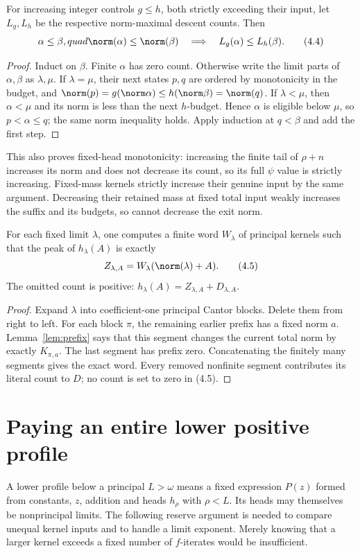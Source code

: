 \documentclass[11pt,a4paper]{article}
\newcommand{\KK}[2]{K_{#1,#2}}
\begin{document}
\begin{lemma}\label{lem:counts}
For increasing integer controls $g\le h$, both strictly exceeding their
input, let $L_g,L_h$ be the respective norm-maximal descent counts.
Then
\[
 \alpha\le\beta,quad\norm(\alpha)\le\norm(\beta)
       \quad\Longrightarrow\quad L_g(\alpha)\le L_h(\beta). \tag{4.4}
\]
\end{lemma}
\begin{proof}
Induct on $\beta$. Finite $\alpha$ has zero count. Otherwise write the
limit parts of $\alpha,\beta$ as $\lambda,\mu$. If $\lambda=\mu$, their
next states $p,q$ are ordered by monotonicity in the budget, and
$\norm(p)=g(\norm\alpha)\le h(\norm\beta)=\norm(q)$.
If $\lambda<\mu$, then $\alpha<\mu$ and its norm is less than the next
$h$-budget. Hence $\alpha$ is eligible below $\mu$, so
$p<\alpha\le q$; the same norm inequality holds. Apply induction at
$q<\beta$ and add the first step.
\end{proof}
This also proves fixed-head monotonicity: increasing the finite tail of
$\rho+n$ increases its norm and does not decrease its count, so its full
$\psi$ value is strictly increasing. Fixed-mass kernels strictly increase
their genuine input by the same argument. Decreasing their retained mass
at fixed total input weakly increases the suffix and its budgets, so cannot
decrease the exit norm.

\begin{lemma}\label{lem:peakword}
For each fixed limit $\lambda$, one computes a finite word $W_\lambda$ of
principal kernels such that the peak of $h_\lambda(A)$ is exactly
\[
             Z_{\lambda,A}=W_\lambda(\norm(\lambda)+A). \tag{4.5}
\]
The omitted count is positive: $h_\lambda(A)=Z_{\lambda,A}+D_{\lambda,A}$.
\end{lemma}
\begin{proof}
Expand $\lambda$ into coefficient-one principal Cantor blocks. Delete them
from right to left. For each block $\pi$, the remaining earlier prefix has
a fixed norm $a$. Lemma~\ref{lem:prefix} says that this segment changes the
current total norm by exactly $\KK\pi a$. The last segment has prefix
zero. Concatenating the finitely many segments gives the exact word.
Every removed nonfinite segment contributes its literal count to $D$;
no count is set to zero in (4.5).
\end{proof}

\section{Paying an entire lower positive profile}
A lower profile below a principal $L>\omega$ means a fixed expression
$P(z)$ formed from constants, $z$, addition and heads $h_\rho$ with
$\rho<L$. Its heads may themselves be nonprincipal limits.
The following reserve argument is needed to compare unequal kernel inputs
and to handle a limit exponent. Merely knowing that a larger kernel exceeds
a fixed number of $f$-iterates would be insufficient.
\end{document}

